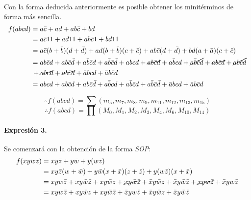 \documentclass[../procedimientos.tex]{subfiles}
\begin{document}
Con la forma deducida anteriormente es posible obtener los minitérminos de 
forma más sencilla.
\begin{align*}
  f(abcd) &= a \bar{c} + a d + a b \bar{c} + bd\\
  &= a \bar{c} 1 1 + a d 1 1 + a b \bar{c} 1 + b d 1 1\\
  &= a \bar{c} (b + \bar{b}) (d + \bar{d}) + a d (b + \bar{b}) (c + \bar{c}) + a b 
  \bar{c} (d + \bar{d}) + b d (a + \bar{a}) (c + \bar{c})\\
  &= ab\bar{c}d + ab\bar{c}\bar{d} + a\bar{b}\bar{c}d + a\bar{b}\bar{c}\bar{d} + abcd 
  + \cancel{ab\bar{c}d} + a\bar{b}cd + \cancel{a\bar{b}\bar{c}d} + 
  \cancel{ab\bar{c}d} + \cancel{ab\bar{c}\bar{d}}\\
  &\, + \cancel{abcd} + \cancel{ab\bar{c}d} + \bar{a}bcd + \bar{a}b\bar{c}d\\
  &= abcd + ab\bar{c}d + ab\bar{c}\bar{d} + a\bar{b}cd + a\bar{b}\bar{c}d + 
  a\bar{b}\bar{c}\bar{d} + \bar{a}bcd + \bar{a}b\bar{c}d
\end{align*}

\begin{equation*}
  \boxed{
    \therefore f(abcd) = \sum (m_5, m_7, m_8, m_9, m_{11}, m_{12}, m_{13}, 
  m_{15})
  }
\end{equation*}
\begin{equation*}
  \boxed{
    \therefore f(abcd) = \prod (M_0, M_1, M_2, M_3, M_4, M_6, M_{10}, M_{14})
  }
\end{equation*}

\paragraph{Expresión 3.} Se comenzará con la obtención de la forma 
\textit{SOP}:
\begin{align*}
  f(xywz) &= x y \bar{z} + y \bar{w} + y (w \bar{z})\\
  &= x y \bar{z} (w + \bar{w}) + y \bar{w} (x + \bar{x}) (z + \bar{z}) + y (w 
  \bar{z}) (x + \bar{x})\\
  &= xyw\bar{z} + xy\bar{w}\bar{z} + xy\bar{w}z + \cancel{xy\bar{w}\bar{z}} + 
  \bar{x}y\bar{w}z + \bar{x}y\bar{w}\bar{z} + \cancel{xyw\bar{z}} + \bar{x}yw\bar{z}\\
  &= xyw\bar{z} + xy\bar{w}z + xy\bar{w}\bar{z} + \bar{x}yw\bar{z} + \bar{x}y\bar{w}z 
  + \bar{x}y\bar{w}\bar{z}
\end{align*}
\end{document}
